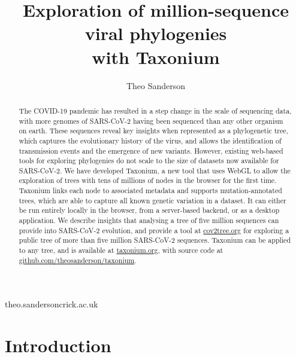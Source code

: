 
\title{Exploration of million-sequence viral phylogenies \\with Taxonium}

\author[1]{Theo Sanderson }

\date{}

\maketitle

\begin{abstract}
The COVID-19 pandemic has resulted in a step change in the scale of sequencing data, with more genomes of SARS-CoV-2 having been sequenced than any other organism on earth. These sequences reveal key insights when represented as a phylogenetic tree, which captures the evolutionary history of the virus, and allows the identification of transmission events and the emergence of new variants. However, existing web-based tools for exploring phylogenies do not scale to the size of datasets now available for SARS-CoV-2. We have developed Taxonium, a new tool that uses WebGL to allow the exploration of trees with tens of millions of nodes in the browser for the first time. Taxonium links each node to associated metadata and supports mutation-annotated trees, which are able to capture all known genetic variation in a dataset. It can either be run entirely locally in the browser, from a server-based backend, or as a desktop application.  We describe insights that analysing a tree of five million sequences can provide into SARS-CoV-2 evolution, and provide a tool at \href{http://cov2tree.org}{cov2tree.org} for exploring a public tree of more than five million SARS-CoV-2 sequences. Taxonium can be applied to any tree, and is available at \href{http://taxonium.org}{taxonium.org}, with source code at \href{https://github.com/theosanderson/taxonium}{github.com/theosanderson/taxonium}.


\end{abstract}


\begin{corrauthor}
theo.sanderson\at crick.ac.uk
\end{corrauthor}

\section*{Introduction}\label{s:introduction}

